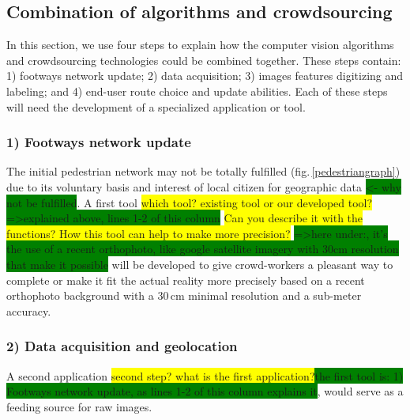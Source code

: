 \documentclass[10pt,conference,a4paper]{IEEEtran}
\begin{document}
\subsection{Combination of algorithms and crowdsourcing}

In this section, we use four steps to explain how the computer vision algorithms and crowdsourcing technologies could be combined together. These steps contain: 1) footways network update; 2) data acquisition; 3) images features digitizing and labeling; and 4) end-user route choice and update abilities. Each of these steps will need the development of a specialized application or tool.


\subsubsection*{1) Footways network update}
The initial pedestrian network  may not be totally fulfilled (fig.\,\ref{pedestriangraph}) due to its voluntary basis and interest of local citizen for geographic data \colorbox{green}{<- why not be fulfilled}. A first tool \colorbox{yellow}{which tool? existing tool or our developed tool? } 
\colorbox{green}{=>explained above, lines 1-2 of this column}
\colorbox{yellow}{Can you describe it with the functions? How this tool can help to make more precision?}
\colorbox{green}{=>here under:, it's the use of a recent orthophoto, like google satellite imagery with 30cm resolution that make it possible}
will be developed to give crowd-workers a pleasant way to complete or make it fit the actual reality more precisely based on a recent orthophoto background with a 30\,cm minimal resolution and a sub-meter accuracy. %


\subsubsection*{2) Data acquisition and geolocation}
A second application \colorbox{yellow}{second step? what is the first application?}\colorbox{green}{the first tool is: 1) Footways network update, as lines 1-2 of this column explains it}, %
would serve as a feeding source for raw images. 
\end{document}
